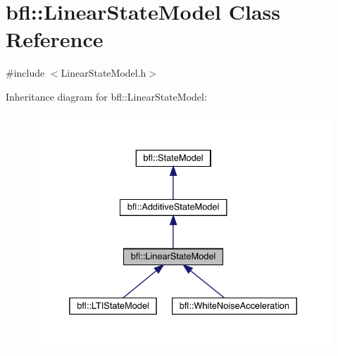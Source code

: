 \hypertarget{classbfl_1_1LinearStateModel}{}\section{bfl\+:\+:Linear\+State\+Model Class Reference}
\label{classbfl_1_1LinearStateModel}


{\ttfamily \#include $<$Linear\+State\+Model.\+h$>$}



Inheritance diagram for bfl\+:\+:Linear\+State\+Model\+:
\nopagebreak
\begin{figure}[H]
\begin{center}
\leavevmode
\includegraphics[width=332pt]{classbfl_1_1LinearStateModel__inherit__graph}
\end{center}
\end{figure}
